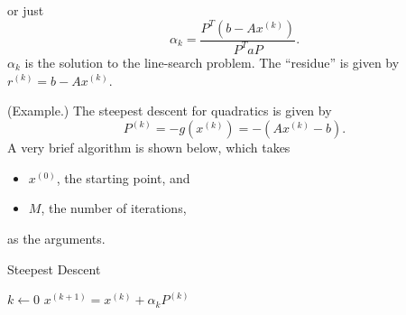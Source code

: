 \documentclass[letterpaper]{article}
\begin{document}
or just \[\alpha_{k} = \frac{P^T (b - Ax^{(k)})}{P^T a P}.\] $\alpha_k$ is the solution to the line-search problem. The ``residue'' is given by $r^{(k)} = b - Ax^{(k)}$.
\begin{mdframed}
    (Example.) The steepest descent for quadratics is given by 
    \[P^{(k)} = -g(x^{(k)}) = -(Ax^{(k)} - b).\]
    A very brief algorithm is shown below, which takes 
    \begin{itemize}
        \item $x^{(0)}$, the starting point, and 
        \item $M$, the number of iterations,
    \end{itemize}
    as the arguments.
    \begin{algorithm}[H]
        \caption{Steepest Descent}
        \begin{algorithmic}[1]
                \State $k \gets 0$
                    \State $x^{(k + 1)} = x^{(k)} + \alpha_{k} P^{(k)}$
                \EndWhile 
            \EndFunction 
        \end{algorithmic}
    \end{algorithm}
\end{mdframed}
\end{document}
